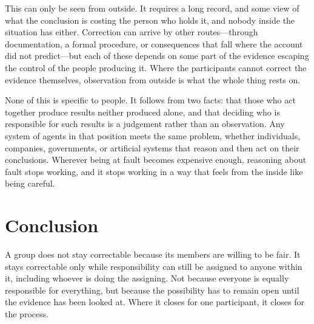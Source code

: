 \documentclass{article}
\begin{document}
This can only be seen from outside. It requires a long record, and some view of what the conclusion is costing the person who holds it, and nobody inside the situation has either. Correction can arrive by other routes---through documentation, a formal procedure, or consequences that fall where the account did not predict---but each of these depends on some part of the evidence escaping the control of the people producing it. Where the participants cannot correct the evidence themselves, observation from outside is what the whole thing rests on.

None of this is specific to people. It follows from two facts: that those who act together produce results neither produced alone, and that deciding who is responsible for such results is a judgement rather than an observation. Any system of agents in that position meets the same problem, whether individuals, companies, governments, or artificial systems that reason and then act on their conclusions. Wherever being at fault becomes expensive enough, reasoning about fault stops working, and it stops working in a way that feels from the inside like being careful.

\section{Conclusion}
A group does not stay correctable because its members are willing to be fair. It stays correctable only while responsibility can still be assigned to anyone within it, including whoever is doing the assigning. Not because everyone is equally responsible for everything, but because the possibility has to remain open until the evidence has been looked at. Where it closes for one participant, it closes for the process.
\end{document}

